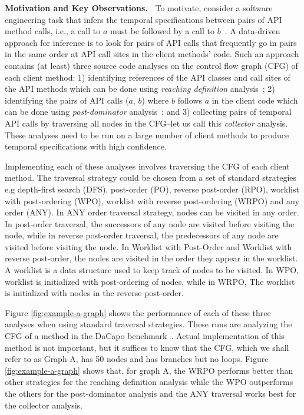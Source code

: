 {\bf Motivation and Key Observations.\ }
To motivate, consider a software engineering task that infers the temporal 
specifications between pairs of API method calls, i.e., a call to $a$ must be 
followed by a call to $b$~\cite{engler-sosp2001,ramanathan-icse2007,weimer-tacas2005,yang-icse2006}. 
A data-driven approach for inference is to look for pairs of API calls that frequently go in pairs in 
the same order at API call sites in the client methods' code. Such an 
approach contains (at least) three source code analyses on the control flow graph 
(CFG) of each client method: 
%
1) identifying references of the API classes and call sites of the API 
methods which can be done using \emph{reaching definition} analysis~\cite{programanalysis}; 
%
2) identifying the pairs of API calls ($a$, $b$) where $b$ follows $a$ in the 
client code which can be done using \emph{post-dominator} analysis~\cite{compilers}; and 
%
3) collecting pairs of temporal API calls by traversing all nodes in the 
CFG--let us call this \emph{collector} analysis. 
%
These analyses need to be run on a large number of client methods to 
produce temporal specifications with high confidence.

Implementing each of these analyses involves traversing the CFG 
of each client method. The traversal strategy could be chosen from a 
set of standard strategies e.g depth-first search (DFS), post-order 
(PO), reverse post-order (RPO), worklist with post-ordering (WPO), 
worklist with reverse post-ordering (WRPO) and any order (ANY).
In ANY order traversal strategy, nodes can
be visited in any order. In post-order traversal, the successors of
any node are visited before visiting the node, while in reverse post-order traversal, the
predecessors of any node are visited before visiting the node. In Worklist with Post-Order and Worklist with reverse post-order, the nodes are visited in the order they appear in the worklist. A worklist is a
data structure used to keep track of nodes to be visited. In WPO, worklist is
initialized with post-ordering of nodes, while in WRPO, The
worklist is initialized with nodes in the reverse post-order.

Figure \ref{fig:example-a-graph} shows the performance of each of these three 
analyses when using standard traversal strategies.
These runs are analyzing the CFG of a method in the DaCapo 
benchmark~\cite{blackburn2006dacapo}. 
Actual implementation of this method is not important, but it suffices
to know that the CFG, which we shall refer to as Graph A, has 50 nodes
and has branches but no loops. Figure \ref{fig:example-a-graph} shows
that, for graph A, the WRPO performs better than other strategies for
the reaching definition analysis while the WPO outperforms the others
for the post-dominator analysis and the ANY traversal works best for
the collector analysis.

